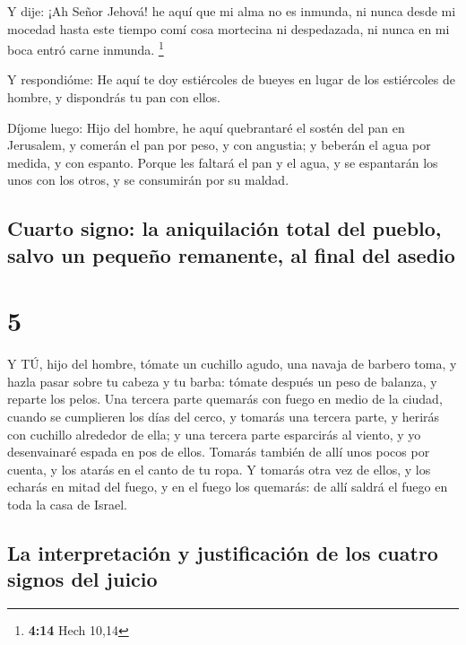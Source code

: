 Y dije: ¡Ah Señor Jehová! he aquí que mi alma no es
inmunda, ni nunca desde mi mocedad hasta este tiempo comí cosa mortecina
ni despedazada, ni nunca en mi boca entró carne inmunda. \footnote{\textbf{4:14}
  Hech 10,14}

 Y respondióme: He aquí te doy estiércoles de bueyes en
lugar de los estiércoles de hombre, y dispondrás tu pan con ellos.

 Díjome luego: Hijo del hombre, he aquí quebrantaré el
sostén del pan en Jerusalem, y comerán el pan por peso, y con angustia;
y beberán el agua por medida, y con espanto.  Porque les
faltará el pan y el agua, y se espantarán los unos con los otros, y se
consumirán por su maldad.

\hypertarget{cuarto-signo-la-aniquilaciuxf3n-total-del-pueblo-salvo-un-pequeuxf1o-remanente-al-final-del-asedio}{%
\subsection{Cuarto signo: la aniquilación total del pueblo, salvo un
pequeño remanente, al final del
asedio}\label{cuarto-signo-la-aniquilaciuxf3n-total-del-pueblo-salvo-un-pequeuxf1o-remanente-al-final-del-asedio}}

\hypertarget{section-4}{%
\section{5}\label{section-4}}

 Y TÚ, hijo del hombre, tómate un cuchillo agudo, una navaja
de barbero toma, y hazla pasar sobre tu cabeza y tu barba: tómate
después un peso de balanza, y reparte los pelos.  Una
tercera parte quemarás con fuego en medio de la ciudad, cuando se
cumplieren los días del cerco, y tomarás una tercera parte, y herirás
con cuchillo alrededor de ella; y una tercera parte esparcirás al
viento, y yo desenvainaré espada en pos de ellos.  Tomarás
también de allí unos pocos por cuenta, y los atarás en el canto de tu
ropa.  Y tomarás otra vez de ellos, y los echarás en mitad
del fuego, y en el fuego los quemarás: de allí saldrá el fuego en toda
la casa de Israel.

\hypertarget{la-interpretaciuxf3n-y-justificaciuxf3n-de-los-cuatro-signos-del-juicio}{%
\subsection{La interpretación y justificación de los cuatro signos del
juicio}\label{la-interpretaciuxf3n-y-justificaciuxf3n-de-los-cuatro-signos-del-juicio}}

